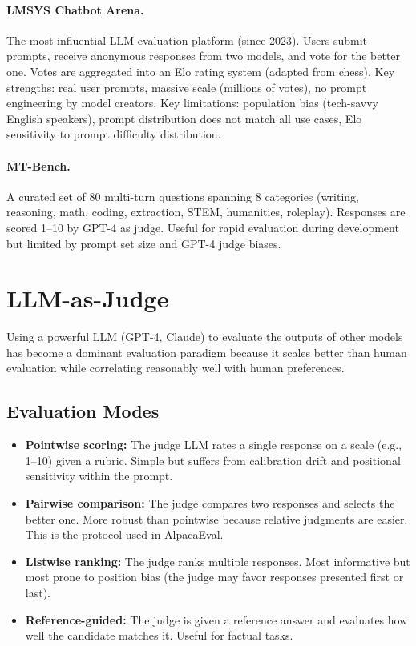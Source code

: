 \paragraph{LMSYS Chatbot Arena.}
The most influential LLM evaluation platform (since 2023).  Users submit
prompts, receive anonymous responses from two models, and vote for the better
one.  Votes are aggregated into an Elo rating system (adapted from chess).  Key
strengths: real user prompts, massive scale (millions of votes), no prompt
engineering by model creators.  Key limitations: population bias (tech-savvy
English speakers), prompt distribution does not match all use cases, Elo
sensitivity to prompt difficulty distribution.

\paragraph{MT-Bench.}
A curated set of 80 multi-turn questions spanning 8 categories (writing,
reasoning, math, coding, extraction, STEM, humanities, roleplay).  Responses are
scored 1--10 by GPT-4 as judge.  Useful for rapid evaluation during development
but limited by prompt set size and GPT-4 judge biases.

\section{LLM-as-Judge}
\label{sec:llm_judge}

Using a powerful LLM (GPT-4, Claude) to evaluate the outputs of other models has
become a dominant evaluation paradigm because it scales better than human
evaluation while correlating reasonably well with human preferences.

\subsection{Evaluation Modes}

\begin{itemize}
    \item \textbf{Pointwise scoring:} The judge LLM rates a single response on a
          scale (e.g., 1--10) given a rubric.  Simple but suffers from
          calibration drift and positional sensitivity within the prompt.
    \item \textbf{Pairwise comparison:} The judge compares two responses and
          selects the better one.  More robust than pointwise because relative
          judgments are easier.  This is the protocol used in AlpacaEval.
    \item \textbf{Listwise ranking:} The judge ranks multiple responses.  Most
          informative but most prone to position bias (the judge may favor
          responses presented first or last).
    \item \textbf{Reference-guided:} The judge is given a reference answer and
          evaluates how well the candidate matches it.  Useful for factual tasks.
\end{itemize}

